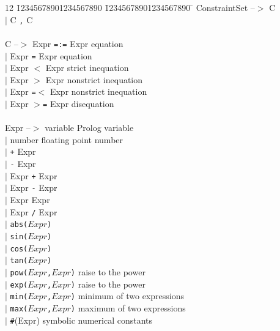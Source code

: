 {\it
\begin{tabbing}
12 \= 12345678901234567890 \= 12345678901234567890 \=	\kill
\> ConstraintSet --$>$   \>  C     \\
\> \>                      $|$ C {\tt ,} C   \\
\\
\> C --$>$ \> Expr {\tt =:=} Expr \> {\rm equation} \\
\>    \> $|$ Expr {\tt =} Expr \> {\rm equation} \\
\>    \> $|$ Expr {\tt $<$} Expr \> {\rm strict inequation} \\
\>    \> $|$ Expr {\tt $>$} Expr \> {\rm nonstrict inequation} \\
\>    \> $|$ Expr {\tt =$<$} Expr \> {\rm nonstrict inequation} \\
\>    \> $|$ Expr {\tt $>$=} Expr \> {\rm disequation} \\
\\
\> Expr --$>$  \> variable \> {\rm Prolog variable} \\
\> \> $|$ number \> {\rm floating point number} \\
\> \> $|$ {\tt +} Expr \\
\> \> $|$ {\tt -} Expr \\
\> \> $|$ Expr {\tt +}  Expr \\
\> \> $|$ Expr {\tt -} Expr \\
\> \> $|$ Expr {\tt *} Expr \\
\> \> $|$ Expr {\tt /} Expr \\
\> \> $|$ {\tt abs($Expr$)} \\
\> \> $|$ {\tt sin($Expr$)} \\
\> \> $|$ {\tt cos($Expr$)} \\
\> \> $|$ {\tt tan($Expr$)} \\
\> \> $|$ {\tt pow($Expr$,$Expr$)} \> {\rm raise to the power} \\
\> \> $|$ {\tt exp($Expr$,$Expr$)} \> {\rm raise to the power} \\
\> \> $|$ {\tt min($Expr$,$Expr$)} \> {\rm minimum of two expressions} \\
\> \> $|$ {\tt max($Expr$,$Expr$)} \> {\rm maximum of two expressions} \\
\> \> $|$ \verb|#|(Expr) \> {\rm symbolic numerical constants} 
\end{tabbing}
}

